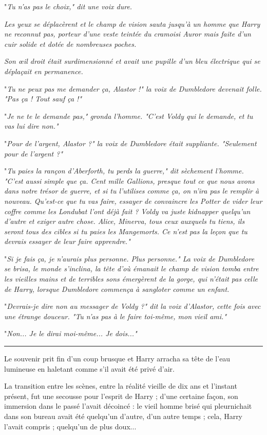 "\emph{Tu n'as pas le choix," dit une voix dure.} 

\emph{Les yeux se déplacèrent et le champ de vision sauta jusqu'à un homme que Harry ne reconnut pas, porteur d'une veste teintée du cramoisi Auror mais faite d'un cuir solide et dotée de nombreuses poches.} 

\emph{Son œil droit était surdimensionné et avait une pupille d'un bleu électrique qui se déplaçait en permanence.} 

"\emph{Tu ne peux pas me demander ça, Alastor !" la voix de Dumbledore devenait folle. "Pas ça ! Tout sauf ça !"} 

"\emph{Je ne te le demande pas," gronda l'homme. "C'est Voldy qui le demande, et tu vas lui dire non."} 

"\emph{Pour de l'argent, Alastor ?" la voix de Dumbledore était suppliante. "Seulement pour de l'argent ?"} 

"\emph{Tu paies la rançon d'Aberforth, tu perds la guerre," dit sèchement l'homme. "C'est aussi simple que ça. Cent mille Gallions, presque tout ce que nous avons dans notre trésor de guerre, et si tu l'utilises comme ça, on n'ira pas le remplir à nouveau. Qu'est-ce que tu vas faire, essayer de convaincre les Potter de vider leur coffre comme les Londubat l'ont déjà fait ? Voldy va juste kidnapper quelqu'un d'autre et exiger autre chose. Alice, Minerva, tous ceux auxquels tu tiens, ils seront tous des cibles si tu paies les Mangemorts. Ce n'est pas la leçon que tu devrais essayer de leur faire apprendre."} 

"\emph{Si je fais ça, je n'aurais plus personne. Plus personne." La voix de Dumbledore se brisa, le monde s'inclina, la tête d'où émanait le champ de vision tomba entre les vieilles mains et de terribles sons émergèrent de la gorge, qui n'était pas celle de Harry, lorsque Dumbledore commença à sangloter comme un enfant.} 

"\emph{Devrais-je dire non au messager de Voldy ?" dit la voix d'Alastor, cette fois avec une étrange douceur. "Tu n'as pas à le faire toi-même, mon vieil ami."} 

"\emph{Non... Je le dirai moi-même... Je dois..."} 
\par\noindent\rule{\textwidth}{0.4pt}
Le souvenir prit fin d'un coup brusque et Harry arracha sa tête de l'eau lumineuse en haletant comme s'il avait été privé d'air.

La transition entre les scènes, entre la réalité vieille de dix ans et l'instant présent, fut une secousse pour l'esprit de Harry ; d'une certaine façon, son immersion dans le passé l'avait décoincé : le vieil homme brisé qui pleurnichait dans son bureau avait été quelqu'un d'autre, d'un autre temps ; cela, Harry l'avait compris ; quelqu'un de plus doux...

